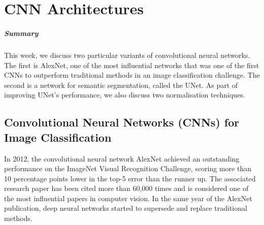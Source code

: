 \chapter{CNN Architectures}%
\label{chap:04}

\paragraph{Summary} This week, we discuss two particular variants of
convolutional neural networks. The first is AlexNet, one of the most influential
networks that was one of the first CNNs to outperform traditional methods in an
image classification challenge. The second is a network for semantic
segmentation, called the UNet. As part of improving UNet's performance, we also
discuss two normalisation techniques.

\section{Convolutional Neural Networks (CNNs) for Image Classification}
In 2012, the convolutional neural network AlexNet achieved an outstanding
performance on the ImageNet Visual Recognition Challenge, scoring more than 10
percentage points lower in the top-5 error than the runner up. The associated
research paper has been cited more than 60,000 times and is considered one of
the most influential papers in computer vision. In the same year of the AlexNet
publication, deep neural networks started to supersede and replace traditional
methods.

